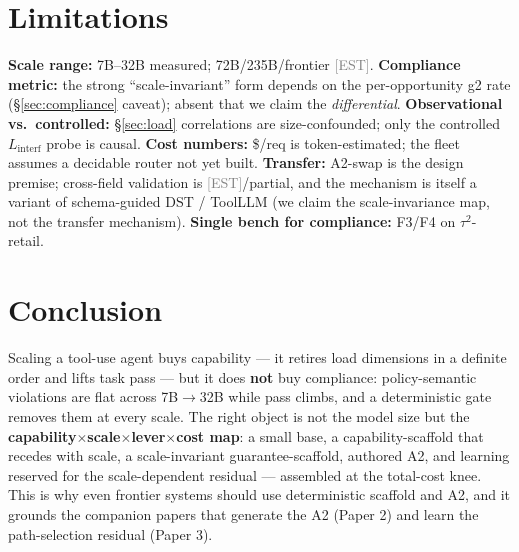 \documentclass[10pt]{article}
\newcommand{\est}{\textcolor{gray}{\small[EST]}}
\begin{document}
\section{Limitations}
\textbf{Scale range:} 7B--32B measured; 72B/235B/frontier \est. \textbf{Compliance metric:} the strong ``scale-invariant'' form depends on the per-opportunity g2 rate (\S\ref{sec:compliance} caveat); absent that we claim the \emph{differential}. \textbf{Observational vs.\ controlled:} \S\ref{sec:load} correlations are size-confounded; only the controlled $L_{\mathrm{interf}}$ probe is causal. \textbf{Cost numbers:} \$/req is token-estimated; the fleet assumes a decidable router not yet built. \textbf{Transfer:} A2-swap is the design premise; cross-field validation is \est/partial, and the mechanism is itself a variant of schema-guided DST / ToolLLM (we claim the scale-invariance map, not the transfer mechanism). \textbf{Single bench for compliance:} F3/F4 on $\tau^2$-retail.

\section{Conclusion}
Scaling a tool-use agent buys capability --- it retires load dimensions in a definite order and lifts task pass --- but it does \textbf{not} buy compliance: policy-semantic violations are flat across 7B$\to$32B while pass climbs, and a deterministic gate removes them at every scale. The right object is not the model size but the \textbf{capability$\times$scale$\times$lever$\times$cost map}: a small base, a capability-scaffold that recedes with scale, a scale-invariant guarantee-scaffold, authored A2, and learning reserved for the scale-dependent residual --- assembled at the total-cost knee. This is why even frontier systems should use deterministic scaffold and A2, and it grounds the companion papers that generate the A2 (Paper 2) and learn the path-selection residual (Paper 3).

\small

\nocite{*}

\end{document}

